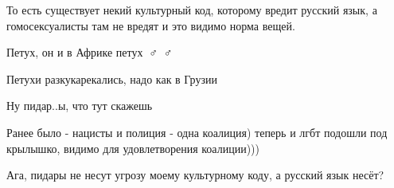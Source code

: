 \begin{itemize}
 
То есть существует некий культурный код, которому вредит русский язык, а гомосексуалисты там не вредят и это видимо норма вещей.

 
Петух, он и в Африке петух🤷🏼♂️🤦🏼♂️

 
Петухи разкукарекались, надо как в Грузии

 
Ну пидар..ы, что тут скажешь

 
Ранее было - нацисты и полиция - одна коалиция) теперь и лгбт подошли под крылышко, видимо для удовлетворения коалиции)))

 
Ага, пидары не несут угрозу моему культурному коду, а русский язык несёт?

 

\end{itemize}
